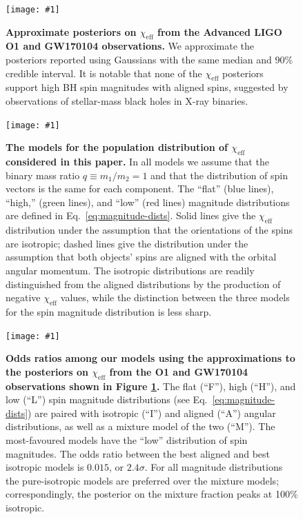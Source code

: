 \documentclass{nature-arxiv}
\newcommand{\chieff}{\chi_\mathrm{eff}}
\newcommand{\OOneSigmaIsoAligned}{2.4}
\newcommand{\OOneOddsIsoAligned}{0.015}
\newcommand{\plotone}[1]{\texttt{[image: \#1]}}
\begin{document}
\newpage 

\begin{figure}
  \plotone{../plots/chi-eff-mock-posteriors}
  \caption{\label{fig:O1-posteriors} \textbf{Approximate posteriors on
      $\chieff$ from the Advanced LIGO O1 and GW170104
      observations\cite{O1-BBH,PhysRevLett.118.221101}.}  We
    approximate the posteriors reported using Gaussians with the same
    median and 90\% credible interval.  It is notable that none of the
    $\chieff$ posteriors support high \ac{BH} spin magnitudes with
    aligned spins, suggested by observations of stellar-mass black
    holes in X-ray binaries\cite{2015PhR...548....1M}.}
\end{figure}

\begin{figure}
  \plotone{../plots/chi-eff-distributions}
  \caption{\label{fig:chieff-distribution-models} \textbf{The models for the
    population distribution of $\chieff$ considered in this paper.}  In
    all models we assume that the binary mass ratio
    $q \equiv m_1/m_2 = 1$ and that the distribution of spin vectors
    is the same for each component.  The ``flat'' (blue lines),
    ``high,'' (green lines), and ``low'' (red lines) magnitude
    distributions are defined in Eq.\ \eqref{eq:magnitude-dists}.
    Solid lines give the $\chieff$ distribution under the assumption
    that the orientations of the spins are isotropic; dashed lines
    give the distribution under the assumption that both objects'
    spins are aligned with the orbital angular momentum.  The
    isotropic distributions are readily distinguished from the aligned
    distributions by the production of negative $\chieff$ values,
    while the distinction between the three models for the spin
    magnitude distribution is less sharp.}
\end{figure}

\begin{figure}
  \plotone{../plots/Wills_evidence_ratio_figure_with_mixture_models}
  \caption{\textbf{Odds ratios among our models using the
      approximations to the posteriors on $\chieff$ from the O1 and GW170104
      observations shown in Figure \ref{fig:O1-posteriors}.}  The flat
    (``F''), high (``H''), and low (``L'') spin magnitude
    distributions (see Eq.\ \eqref{eq:magnitude-dists}) are paired
    with isotropic (``I'') and aligned (``A'') angular distributions,
    as well as a mixture model of the two (``$\mathrm{M}$'').  The
    most-favoured models have the ``low'' distribution of spin
    magnitudes.  The odds ratio between the best aligned and best
    isotropic models is $\OOneOddsIsoAligned$, or
    $\OOneSigmaIsoAligned\sigma$.  For all magnitude distributions the
    pure-isotropic models are preferred over the mixture models;
    correspondingly, the posterior on the mixture fraction peaks at
    100\% isotropic.}
  \label{fig:O1-odds}
\end{figure}
\end{document}
